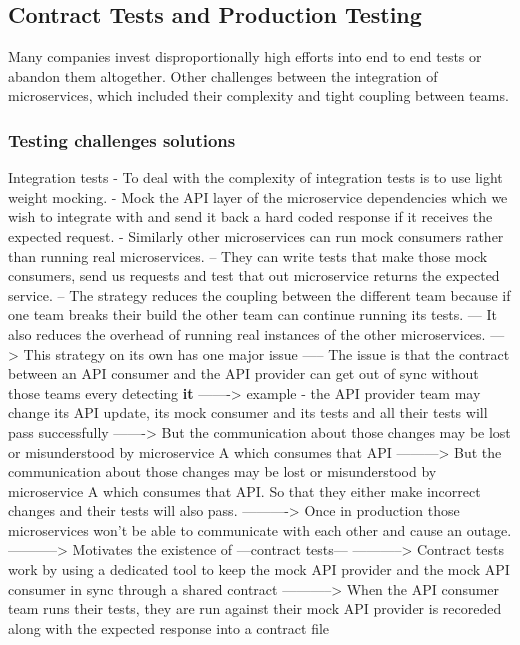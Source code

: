 \documentclass[a4paper, 11pt]{book}
\begin{document}
{    \subsection{Contract Tests and Production Testing}
    Many companies invest disproportionally high efforts into end to end tests or abandon them altogether.
    Other challenges between the integration of microservices, which included their complexity and tight coupling between teams.

    \subsubsection{Testing challenges solutions}
    Integration tests
    - To deal with the complexity of integration tests is to use light weight mocking.
    - Mock the API layer of the microservice dependencies which we wish to integrate with and send it back a hard coded response if it receives the expected request.
    - Similarly other microservices can run mock consumers rather than running real microservices.
    -- They can write tests that make those mock consumers, send us requests and test that out microservice returns the expected service.
    -- The strategy reduces the coupling between the different team because if one team breaks their build the other team can continue running its tests.
    --- It also reduces the overhead of running real instances of the other microservices.
    ---> This strategy on its own has one major issue
    ----- The issue is that the contract between an API consumer and the API provider can get out of sync without those teams every detecting \textbf{it}
    -------> example - the API provider team may change its API update, its mock consumer and its tests and all their tests will pass successfully
    -------> But the communication about those changes may be lost or misunderstood by microservice A which consumes that API
    ---------> But the communication about those changes may be lost or misunderstood by microservice A which consumes that API. So that they either make incorrect changes and their tests will also pass.
    ----------> Once in production those microservices won't be able to communicate with each other and cause an outage.
    -----------> Motivates the existence of ---contract tests---
    -----------> Contract tests work by using a dedicated tool to keep the mock API provider and the mock API consumer in sync through a shared contract
    -----------> When the API consumer team runs their tests, they are run against their mock API provider is recoreded along with the expected response into a contract file
}
\end{document}

